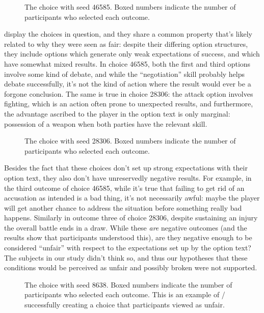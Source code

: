 \begin{figure}[!b]
\caption[``Unexpected failure'' choice 46585]{The \unxf{} choice with seed 46585. Boxed numbers indicate the number of participants who selected each outcome.}
\label{fig:e2-seed-46585}
\end{figure}


 display the choices in question, and they share a common property that's likely related to why they were seen as fair: despite their differing option structures, they include options which generate only weak expectations of success, and which have somewhat mixed results.
%
In choice 46585, both the first and third options involve some kind of debate, and while the ``negotiation'' skill probably helps debate successfully, it's not the kind of action where the result would ever be a forgone conclusion.
%
The same is true in choice 28306: the attack option involves fighting, which is an action often prone to unexpected results, and furthermore, the advantage ascribed to the player in the option text is only marginal: possession of a weapon when both parties have the relevant skill.

\begin{figure}[t]
\caption[``Obvious failure'' choice 28306]{The \obvf{} choice with seed 28306. Boxed numbers indicate the number of participants who selected each outcome.}
\label{fig:e2-seed-28306}
\end{figure}


Besides the fact that these choices don't set up strong expectations with their option text, they also don't have unreservedly negative results.
%
For example, in the third outcome of choice 46585, while it's true that failing to get rid of an accusation as intended is a bad thing, it's not necessarily awful: maybe the player will get another chance to address the situation before something really bad happens.
%
Similarly in outcome three of choice 28306, despite sustaining an injury the overall battle ends in a draw.
%
While these \emph{are} negative outcomes (and the results show that participants understood this), are they negative enough to be considered ``unfair'' with respect to the expectations set up by the option text?
%
The subjects in our study didn't think so, and thus our hypotheses that these conditions would be perceived as unfair and possibly broken were not supported.

\begin{figure}[!t]
\caption[``Obvious failure'' choice 8638]{The \obvf{} choice with seed 8638. Boxed numbers indicate the number of participants who selected each outcome. This is an example of \dunyazad/ successfully creating a choice that participants viewed as unfair.}
\label{fig:e2-seed-8638}
\end{figure}


